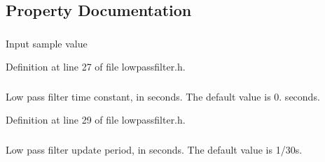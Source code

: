 \subsection{\-Property \-Documentation}
\hypertarget{class_low_pass_filter_a9a9e7b2ff54b0fc7268a5cc3e9e6fbf4}{
\subsubsection[{input}]{}}\label{class_low_pass_filter_a9a9e7b2ff54b0fc7268a5cc3e9e6fbf4}
\-Input sample value 

\-Definition at line 27 of file lowpassfilter.\-h.

\hypertarget{class_low_pass_filter_ab761ee5ebd0249c6724c17d1e0d42500}{
\subsubsection[{time\-Constant}]{}}\label{class_low_pass_filter_ab761ee5ebd0249c6724c17d1e0d42500}
\-Low pass filter time constant, in seconds. \-The default value is 0. seconds. 

\-Definition at line 29 of file lowpassfilter.\-h.

\hypertarget{class_low_pass_filter_a2587a6787fa752084a473ec21a25222a}{
\subsubsection[{update\-Period}]{}}\label{class_low_pass_filter_a2587a6787fa752084a473ec21a25222a}
\-Low pass filter update period, in seconds. \-The default value is 1/30s. 


